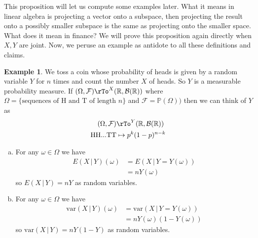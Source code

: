\documentclass[12pt]{amsart}
\theoremstyle{definition}
\newtheorem{example}[theorem]{Example}
\begin{document}
This proposition will let us compute some examples later. What it means in linear algebra is projecting a vector onto a subspace, then projecting the result onto a possibly smaller subspace is the same as projecting onto the smaller space. What does it mean in finance? We will prove this proposition again directly when $X, Y$ are joint. Now, we peruse an example as antidote to all these definitions and claims.

\begin{example} We toss a coin whose probability of heads is given by a random variable $Y$ for $n$ times and count the number $X$ of heads. So $Y$ is a measurable probability measure. If $(\Omega, \mathcal{F}) \rTo^X (\mathbb{R}, \mathcal{B}(\mathbb{R}))$ where $\Omega = \{\text{sequences of H and T of length } n\}$ and $\mathcal{F} = \mathbb{P}(\Omega))$ then we can think of $Y$ as
\begin{align*}
(\Omega, \mathcal{F}) & \rTo^Y (\mathbb{R}, \mathcal{B}(\mathbb{R})) \\
\text{HH...TT} & \mapsto p^k(1 - p)^{n-k}
\end{align*}
\begin{enumerate}[a.]
\item For any $\omega \in \Omega$ we have
\begin{align*}
E(X \,|\, Y)(\omega) & = E(X \,|\, Y = Y(\omega)) \\
 & = nY(\omega)
\end{align*}
so $E(X \,|\, Y) = nY$ as random variables.
\item For any $\omega \in \Omega$ we have
\begin{align*}
\text{var}(X \,|\, Y)(\omega) & = \text{var}(X \,|\, Y = Y(\omega)) \\
 & = nY(\omega)(1- Y(\omega))
\end{align*}
so $\text{var}(X \,|\, Y) = nY(1-Y)$ as random variables.


\end{enumerate}
\end{example}
\end{document}
